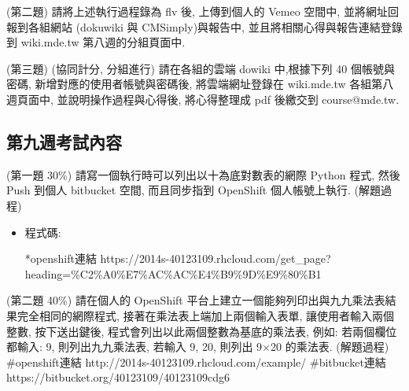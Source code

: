 \documentclass[]{article}
\newenvironment{Shaded}{}{}
\newcommand{\KeywordTok}[1]{\textcolor[rgb]{0.00,0.44,0.13}{\textbf{{#1}}}}
\newcommand{\DataTypeTok}[1]{\textcolor[rgb]{0.56,0.13,0.00}{{#1}}}
\newcommand{\DecValTok}[1]{\textcolor[rgb]{0.25,0.63,0.44}{{#1}}}
\newcommand{\CharTok}[1]{\textcolor[rgb]{0.25,0.44,0.63}{{#1}}}
\newcommand{\StringTok}[1]{\textcolor[rgb]{0.25,0.44,0.63}{{#1}}}
\newcommand{\OtherTok}[1]{\textcolor[rgb]{0.00,0.44,0.13}{{#1}}}
\newcommand{\NormalTok}[1]{{#1}}
\begin{document}
(第二題) 請將上述執行過程錄為 flv 後, 上傳到個人的 Vemeo 空間中,
並將網址回報到各組網站 (dokuwiki 與 CMSimply)與報告中,
並且將相關心得與報告連結登錄到 wiki.mde.tw 第八週的分組頁面中.

(第三題) (協同計分, 分組進行) 請在各組的雲端 dowiki 中,根據下列 40
個帳號與密碼, 新增對應的使用者帳號與密碼後, 將雲端網址登錄在 wiki.mde.tw
各組第八週頁面中, 並說明操作過程與心得後, 將心得整理成 pdf 後繳交到
course@mde.tw.

\subsection{第九週考試內容}\label{ux7b2cux4e5dux9031ux8003ux8a66ux5167ux5bb9}

(第一題 30\%) 請寫一個執行時可以列出以十為底對數表的網際 Python 程式,
然後 Push 到個人 bitbucket 空間, 而且同步指到 OpenShift 個人帳號上執行.
(解題過程)

\begin{itemize}
\item
  程式碼:

\begin{Shaded}
\end{Shaded}

  *openshift連結
  https://2014s-40123109.rhcloud.com/get\_page?heading=\%C2\%A0\%E7\%AC\%AC\%E4\%B9\%9D\%E9\%80\%B1
\end{itemize}

(第二題 40\%) 請在個人的 OpenShift
平台上建立一個能夠列印出與九九乘法表結果完全相同的網際程式,
接著在乘法表上端加上兩個輸入表單, 讓使用者輸入兩個整數, 按下送出鍵後,
程式會列出以此兩個整數為基底的乘法表, 例如: 若兩個欄位都輸入: 9,
則列出九九乘法表, 若輸入 9, 20, 則列出 9×20 的乘法表. (解題過程)
\#openshift連結 http://2014s-40123109.rhcloud.com/example/
\#bitbucket連結 https://bitbucket.org/40123109/40123109cdg6
\end{document}
